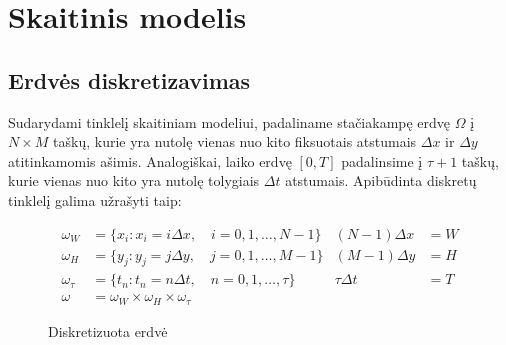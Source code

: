 \section{Skaitinis modelis}

\subsection{Erdvės diskretizavimas}

Sudarydami tinklelį skaitiniam modeliui, padaliname stačiakampę erdvę $\Omega$ į $N\times M$ taškų, kurie yra nutolę vienas nuo kito fiksuotais atstumais $\Delta x$ ir $\Delta y$ atitinkamomis ašimis. Analogiškai, laiko erdvę $[0, T]$ padalinsime į $\tau + 1$ taškų, kurie vienas nuo kito yra nutolę tolygiais $\Delta t$ atstumais. Apibūdinta diskretų tinklelį galima užrašyti taip:

\begin{align}
    \omega_W&=\{ x_i : x_i = i\Delta x, \quad i=0, 1, \dots, N - 1 \} & (N-1)\Delta x&=W\\
    \omega_H&=\{ y_j : y_j = j\Delta y, \quad j=0, 1, \dots, M - 1 \} & (M-1)\Delta y&=H\\
    \omega_\tau&=\{ t_n : t_n = n\Delta t,\quad n=0, 1, \dots, \tau\} & \tau\Delta t&=T\\
	\omega&=\omega_W\times\omega_H\times\omega_\tau
\end{align}

\begin{figure}[!h]
\centering
{}
\caption{ Diskretizuota erdvė }
\end{figure}



